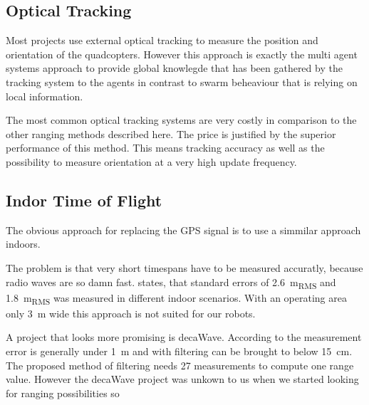 \subsection{Optical Tracking}

Most projects use external optical tracking to measure the position and orientation of the quadcopters. 
However this approach is exactly the multi agent systems approach to provide global knowlegde that has been gathered by the tracking system to the agents in contrast to swarm beheaviour that is relying on local information.

The most common optical tracking systems are very costly in comparison to the other ranging methods described here.
The price is justified by the superior performance of this method. 
This means tracking accuracy as well as the possibility to measure orientation at a very high update frequency.



\subsection{Indor Time of Flight}
The obvious approach for replacing the GPS signal is to use a simmilar approach indoors.

The problem is that very short timespans have to be measured accuratly, because radio waves are so damn fast. 
\cite{lanzisera2006} states, that standard errors of \SI{2.6}{\metre_{RMS}} and \SI{1.8}{\metre_{RMS}} was measured in different indoor scenarios.
With an operating area only \SI{3}{\metre} wide this approach is not suited for our robots.


A project that looks more promising is decaWave.
According to \cite{uwb_localisation_copter} the measurement error is generally under \SI{1}{\metre} and with filtering can be brought to below \SI{15}{\centi\metre}.
The proposed method of filtering needs 27 measurements to compute one range value.
However the decaWave project was unkown to us when we started looking for ranging possibilities so 

